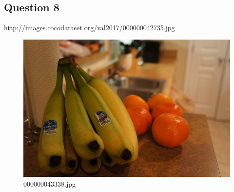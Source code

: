 \subsection*{Question 8}
http://images.cocodataset.org/val2017/000000042735.jpg
    \begin{figure}[h]
        \centering
        \includegraphics[width=0.8\linewidth]{../image set/easy/000000043338.jpg}
        \caption{000000043338.jpg}
    \end{figure}
